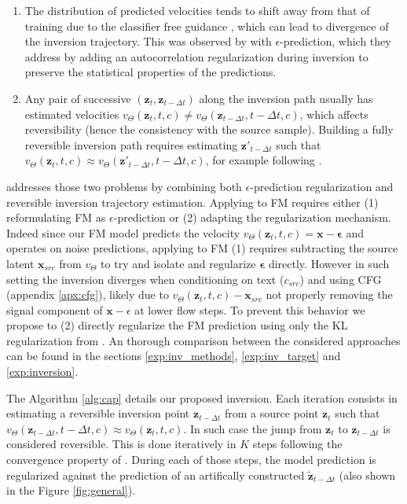 \begin{enumerate}
\item The distribution of predicted velocities tends to shift away from that of training due to the classifier free guidance \citep{mokady2023null}, which can lead to divergence of the inversion trajectory. This was observed by \citet{parmar2023zero} with $\epsilon$-prediction, which they address by adding an autocorrelation regularization during inversion to preserve the statistical properties of the predictions.
\item Any pair of successive $(\mathbf{z}_{t},\mathbf{z}_{t - \Delta t})$ along the inversion path usually has estimated velocities $v_{\Theta}(\mathbf{z}_{t}, t, c) \neq v_{\Theta}(\mathbf{z}_{t - \Delta t}, t - \Delta t, c)$, which affects reversibility (hence the consistency with the source sample).
Building a fully reversible inversion path requires estimating $\mathbf{z'}_{t - \Delta t}$ such that $v_{\Theta}(\mathbf{z}_{t}, t, c) \approx v_{\Theta}(\mathbf{z'}_{t - \Delta t}, t - \Delta t, c)$, for example following \citet{garibi2024renoise}.

\end{enumerate}

\renoise \citep{garibi2024renoise} addresses those two problems by combining both $\epsilon$-prediction regularization and reversible inversion trajectory estimation.
Applying \renoise to FM requires either (1) reformulating FM as $\epsilon$-prediction or (2) adapting the regularization mechanism.
Indeed since our FM model predicts the velocity $v_{\Theta}(\mathbf{z}_t,t,c)=\mathbf{x}-\mathbf{\epsilon}$ and \renoise operates on noise predictions, applying \renoise to FM (1) requires subtracting the source latent $\mathbf{x}_{src}$ from $v_{\Theta}$ to try and isolate and regularize $\mathbf{\epsilon}$ directly.
However in such setting the inversion diverges when conditioning on text ($c_{src}$) and using CFG (appendix \ref{apx:cfg}), likely due to $v_{\Theta}(\mathbf{z}_t,t,c)-\mathbf{x}_{src}$ not properly removing the signal component of $\mathbf{x} - \epsilon$ at lower flow steps.
To prevent this behavior we propose to (2) directly regularize the FM prediction using only the KL regularization from \citet{garibi2024renoise}.
An thorough comparison between the considered approaches can be found in the sections \ref{exp:inv_methods}, \ref{exp:inv_target} and \ref{exp:inversion}.

The Algorithm \ref{alg:cap} details our proposed inversion. Each iteration consists in estimating a reversible inversion point $\mathbf{z}_{t-\Delta t}$ from a source point $\mathbf{z}_{t}$ such that $v_{\Theta}(\mathbf{z}_{t-\Delta t}, t-\Delta t, c) \approx v_{\Theta}(\mathbf{z}_{t}, t, c)$. In such case the jump from $\mathbf{z}_{t}$ to $\mathbf{z}_{t-\Delta t}$ is considered reversible. This is done iteratively in $K$ steps following the convergence property of \citet{garibi2024renoise}.
During each of those steps, the model prediction is regularized against the prediction of an artifically constructed $\mathbf{\tilde{z}}_{t-\Delta{t}}$ (also shown in the Figure \ref{fig:general}).

